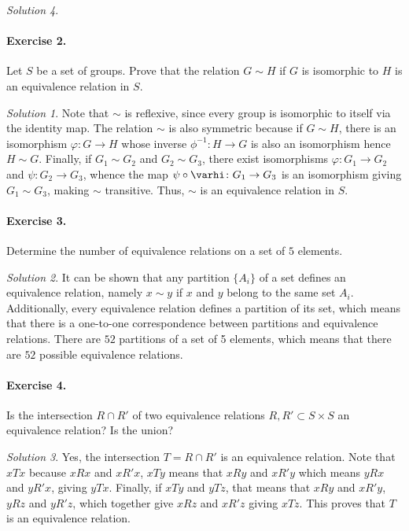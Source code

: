 \documentclass[11pt]{report}
\theoremstyle{remark}
\newtheorem*{solution}{Solution}
\begin{document}
\begin{solution}
    \paragraph{Exercise 2.} Let $S$ be a set of groups. Prove that the relation
    $G\sim H$ if $G$ is isomorphic to $H$ is an equivalence relation in $S$.
    \begin{solution}
        Note that $\sim$ is reflexive, since every group is isomorphic to itself via
        the identity map. The relation $\sim$ is also symmetric because if $G\sim
        H$, there is an isomorphism $\varphi \colon G \to H$ whose inverse
        $\phi^{-1}\colon H \to G$ is also an isomorphism hence $H \sim G$. Finally,
        if $G_1 \sim G_2$ and $G_2 \sim G_3$, there exist isomorphisms
        $\varphi\colon G_1 \to G_2$ and $\psi\colon G_2 \to G_3$, whence the map
        $\psi\circ \varhi\colon G_1 \to G_3$ is an isomorphism giving $G_1 \sim
        G_3$, making $\sim$ transitive. Thus, $\sim$ is an equivalence relation in
        $S$.
    \end{solution}
    
    \paragraph{Exercise 3.} Determine the number of equivalence relations on a set
    of $5$ elements.
    \begin{solution}
        It can be shown that any partition $\{A_i\}$ of a set defines an equivalence
        relation, namely $x \sim y$ if $x$ and $y$ belong to the same set $A_i$.
        Additionally, every equivalence relation defines a partition of its set,
        which means that there is a one-to-one correspondence between partitions and
        equivalence relations.  There are $52$ partitions of a set of 5 elements,
        which means that there are $52$ possible equivalence relations.
    \end{solution}

    \paragraph{Exercise 4.} Is the intersection $R \cap R'$ of two equivalence
    relations $R, R' \subset S \times S$ an equivalence relation? Is the union?
    \begin{solution}
        Yes, the intersection $T = R\cap R'$ is an equivalence relation. Note that
        $xTx$ because $xRx$ and $xR'x$, $xTy$ means that $xRy$ and $xR'y$ which
        means $yRx$ and $yR'x$, giving $yTx$. Finally, if $xTy$ and $yTz$, that
        means that $xRy$ and $xR'y$, $yRz$ and $yR'z$, which together give $xRz$ and
        $xR'z$ giving $xTz$. This proves that $T$ is an equivalence relation.


\end{solution}
\end{solution}
\end{document}
